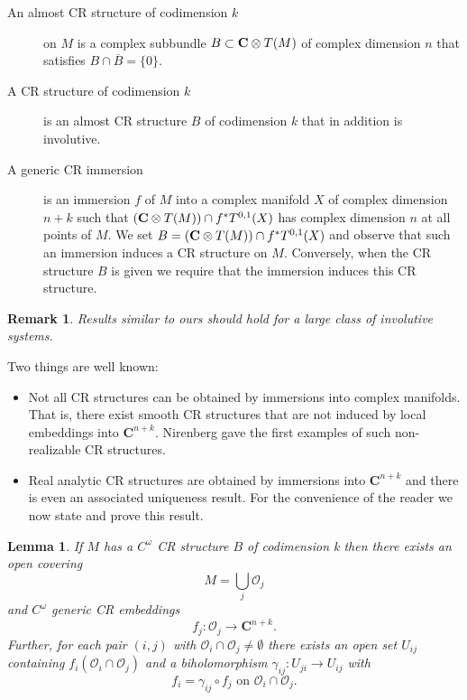 \documentclass{amsart}
\newtheorem{lemma}{Lemma}[section]
\newtheorem{remark}{Remark}
\begin{document}
\begin{description}
\item
	[An almost CR structure of codimension $k$] on $M$ is a complex subbundle
    $B\subset {{\bf{C}}\otimes T(M)}$ of complex dimension $n$ that satisfies $B\cap {\overline B}=\{ 0 \} .$
\item 	
	[A CR structure of codimension $k$] is an almost  CR structure $B$ of codimension $k$ that in addition is involutive. 
	
\item 
	[A generic CR  immersion] is an immersion $f$  of $M$ into a complex
    manifold $X$ of complex dimension $n+k$ such that $({{\bf{C}}\otimes T(M)})\cap f^*{T^{0,1}} (X )$
    has complex dimension $n$ at all points of $M$.  We set $B=({{\bf{C}}\otimes T(M)})\cap
    f^*{T^{0,1}} (X)$ and observe that such an immersion induces a CR
    structure on $M$.  Conversely, when the CR structure $B$ is given
    we require that the immersion induces this CR structure.
\end{description}

\begin{remark}
Results similar to ours should hold for a large class of involutive systems.  
\end{remark}

Two things are  well known:
\begin{itemize}
\item
Not all CR structures can be obtained by
immersions into complex manifolds. That is, there exist smooth CR
structures that  are not induced by local
embeddings into ${\mathbf{C}} ^{n+k}$. Nirenberg \cite[page 13]{Ni} gave the 
first examples of such non-realizable CR structures.

\item
Real analytic
CR structures are obtained by immersions into ${\mathbf{C}} ^{n+k}$ and there
is even an associated uniqueness result.  For the convenience of the
reader we now state and prove this result.
\end{itemize}

\begin{lemma}\label{CR}
If $M$ has a $C^\omega$ CR structure $B$ of codimension  k then there exists an open covering 
\[
M=\bigcup _j {\mathcal{O}} _j
\]
and $C^\omega $ generic CR  embeddings
\[
f_j:{\mathcal{O}} _j\to {\mathbf{C}} ^{n+k} .\]
Further, for each pair $(i,j)$ with  ${\mathcal{O}} _i \cap {\mathcal{O}} _j\neq \emptyset $ there exists an open set $U _{ij}$ containing $f_i({\mathcal{O}} _i\cap {\mathcal{O}} _j )$ and a biholomorphism $\gamma _{ij}:U_{ji}\to U_{ij}$ with
\[
f_i=\gamma _{ij}\circ f_j \text{ on } {\mathcal{O}} _i\cap {\mathcal{O}}_j.
\]
\end{lemma}
\end{document}
